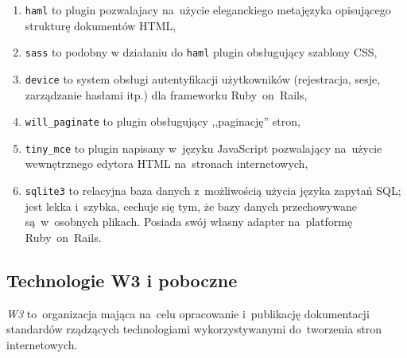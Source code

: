 \begin{enumerate}
  \item \texttt{haml} \cite{haml} to plugin pozwalajacy na~użycie eleganckiego metajęzyka opisującego strukturę dokumentów HTML,
  \item \texttt{sass} \cite{sass} to podobny w działaniu do \texttt{haml} plugin obsługujący szablony CSS,
  \item \texttt{device} \cite{devise} to system obsługi autentyfikacji użytkowników (rejestracja, sesje, zarządzanie hasłami itp.) dla frameworku Ruby~on~Rails,
  \item \texttt{will\_paginate} \cite{will.paginate} to plugin obsługujący ,,paginację'' stron,
  \item \texttt{tiny\_mce} \cite{tiny.mce} to plugin napisany w~języku JavaScript pozwalający na~użycie wewnętrznego edytora HTML na~stronach internetowych,
  \item \texttt{sqlite3} \cite{sqlite3} to relacyjna baza danych z~możliwością użycia języka zapytań SQL; jest lekka i~szybka, cechuje się tym, że bazy danych przechowywane są~w~osobnych plikach. Posiada swój własny adapter na~platformę Ruby~on~Rails.
\end{enumerate}

\subsection{Technologie W3 i poboczne} \label{technologie.web}

\textit{W3} \cite{w3} to~organizacja mająca na~celu opracowanie i~publikację dokumentacji standardów rządzących technologiami wykorzystywanymi do~tworzenia stron internetowych.

